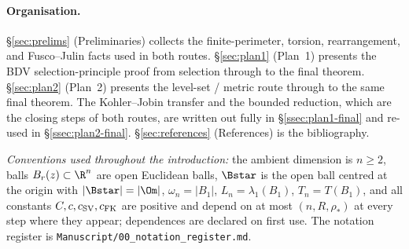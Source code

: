 \paragraph{Organisation.}
\S\ref{sec:prelims} (Preliminaries) collects the finite-perimeter,
torsion, rearrangement, and Fusco--Julin facts used in both routes.
\S\ref{sec:plan1} (Plan~1) presents the BDV selection-principle proof
from selection through to the final theorem. \S\ref{sec:plan2}
(Plan~2) presents the level-set / metric route through to the same
final theorem. The Kohler--Jobin transfer and the bounded reduction,
which are the closing steps of both routes, are written out fully in
\S\ref{ssec:plan1-final} and re-used in \S\ref{ssec:plan2-final}.
\S\ref{sec:references} (References) is the bibliography.

\bigskip

\noindent\emph{Conventions used throughout the introduction:} the
ambient dimension is $n\ge 2$, balls $B_r(z)\subset\R^n$ are open
Euclidean balls, $\Bstar$ is the open ball centred at the origin with
$|\Bstar|=|\Om|$, $\omega_n=|B_1|$, $L_n=\lambda_1(B_1)$, $T_n=T(B_1)$,
and all constants $C, c, c_{\rm SV}, c_{\rm FK}$ are positive and
depend on at most $(n,R,\rho_*)$ at every step where they appear;
dependences are declared on first use. The notation register is
\texttt{Manuscript/00\_notation\_register.md}.

